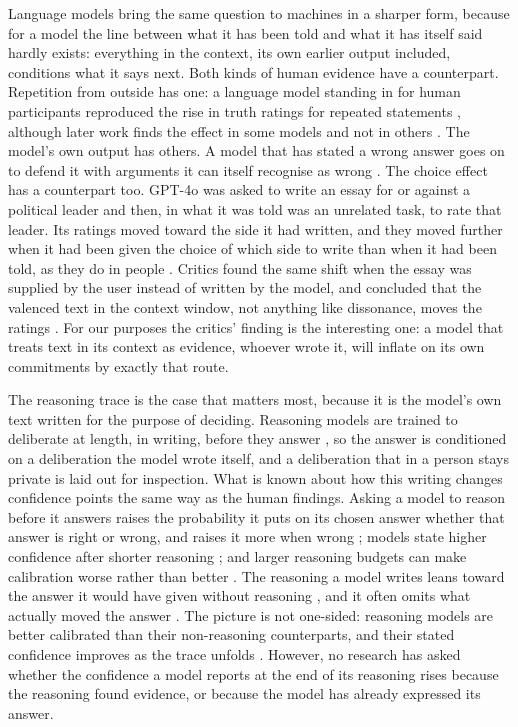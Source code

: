 \documentclass[11pt]{article}
\begin{document}
Language models bring the same question to machines in a sharper form, because for a model the line between what it has been told and what it has itself said hardly exists: everything in the context, its own earlier output included, conditions what it says next. Both kinds of human evidence have a counterpart. Repetition from outside has one: a language model standing in for human participants reproduced the rise in truth ratings for repeated statements \citep{griffin2023susceptibility}, although later work finds the effect in some models and not in others \citep{bouleimen2026illusory}. The model's own output has others. A model that has stated a wrong answer goes on to defend it with arguments it can itself recognise as wrong \citep{zhang2024how}. The choice effect has a counterpart too. GPT-4o was asked to write an essay for or against a political leader and then, in what it was told was an unrelated task, to rate that leader. Its ratings moved toward the side it had written, and they moved further when it had been given the choice of which side to write than when it had been told, as they do in people \citep{lehr2025kernels}. Critics found the same shift when the essay was supplied by the user instead of written by the model, and concluded that the valenced text in the context window, not anything like dissonance, moves the ratings \citep{cummins2025cognitive}. For our purposes the critics' finding is the interesting one: a model that treats text in its context as evidence, whoever wrote it, will inflate on its own commitments by exactly that route.

The reasoning trace is the case that matters most, because it is the model's own text written for the purpose of deciding. Reasoning models are trained to deliberate at length, in writing, before they answer \citep{guo2025deepseek,yang2025qwen3}, so the answer is conditioned on a deliberation the model wrote itself, and a deliberation that in a person stays private is laid out for inspection. What is known about how this writing changes confidence points the same way as the human findings. Asking a model to reason before it answers raises the probability it puts on its chosen answer whether that answer is right or wrong, and raises it more when wrong \citep{fu2026multiple}; models state higher confidence after shorter reasoning \citep{zeng2025thinking}; and larger reasoning budgets can make calibration worse rather than better \citep{lacombe2025dont,hiremath2026calibration}. The reasoning a model writes leans toward the answer it would have given without reasoning \citep{wan2025unveiling}, and it often omits what actually moved the answer \citep{turpin2023language,chen2025reasoning}. The picture is not one-sided: reasoning models are better calibrated than their non-reasoning counterparts, and their stated confidence improves as the trace unfolds \citep{yoon2025reasoning}. However, no research has asked whether the confidence a model reports at the end of its reasoning rises because the reasoning found evidence, or because the model has already expressed its answer.
\end{document}
